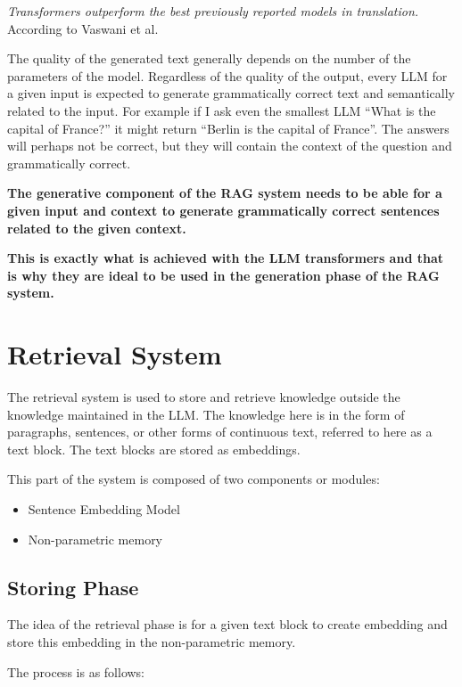 \documentclass{wseas}
\begin{document}
\emph{Transformers outperform the best previously reported models in
translation.} According to Vaswani et al.~\cite{cite1}

The quality of the generated text generally depends on the number of the
parameters of the model. Regardless of the quality of the output, every
LLM for a given input is expected to generate grammatically correct text
and semantically related to the input. For example if I ask even the
smallest LLM ``What is the capital of France?'' it might return ``Berlin
is the capital of France''. The answers will perhaps not be correct, but
they will contain the context of the question and grammatically correct.

\textbf{The generative component of the RAG system needs to be able for
a given input and context to generate grammatically correct sentences
related to the given context.}

\textbf{This is exactly what is achieved with the LLM transformers and
that is why they are ideal to be used in the generation phase of the RAG
system.}

\section{Retrieval System}

The retrieval system is used to store and retrieve knowledge outside the
knowledge maintained in the LLM. The knowledge here is in the form of
paragraphs, sentences, or other forms of continuous text, referred to
here as a text block. The text blocks are stored as embeddings.

This part of the system is composed of two components or modules:

\begin{itemize}

\item
  Sentence Embedding Model
\item
  Non-parametric memory
\end{itemize}

\subsection{Storing Phase}

The idea of the retrieval phase is for a given text block to create
embedding and store this embedding in the non-parametric memory.

The process is as follows:
\end{document}
